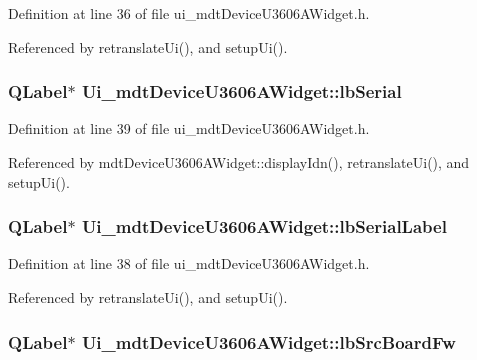 Definition at line 36 of file ui\-\_\-mdt\-Device\-U3606\-A\-Widget.\-h.



Referenced by retranslate\-Ui(), and setup\-Ui().

\hypertarget{class_ui__mdt_device_u3606_a_widget_a268a390c071e035acaa2f1b4d211bc31}{
\subsubsection[{lb\-Serial}]{\setlength{\rightskip}{0pt plus 5cm}Q\-Label$\ast$ Ui\-\_\-mdt\-Device\-U3606\-A\-Widget\-::lb\-Serial}}\label{class_ui__mdt_device_u3606_a_widget_a268a390c071e035acaa2f1b4d211bc31}


Definition at line 39 of file ui\-\_\-mdt\-Device\-U3606\-A\-Widget.\-h.



Referenced by mdt\-Device\-U3606\-A\-Widget\-::display\-Idn(), retranslate\-Ui(), and setup\-Ui().

\hypertarget{class_ui__mdt_device_u3606_a_widget_abdff7cf61e6f613b24d1799522c0e357}{
\subsubsection[{lb\-Serial\-Label}]{\setlength{\rightskip}{0pt plus 5cm}Q\-Label$\ast$ Ui\-\_\-mdt\-Device\-U3606\-A\-Widget\-::lb\-Serial\-Label}}\label{class_ui__mdt_device_u3606_a_widget_abdff7cf61e6f613b24d1799522c0e357}


Definition at line 38 of file ui\-\_\-mdt\-Device\-U3606\-A\-Widget.\-h.



Referenced by retranslate\-Ui(), and setup\-Ui().

\hypertarget{class_ui__mdt_device_u3606_a_widget_a7e48af183581a6be283f8fef932e8ec0}{
\subsubsection[{lb\-Src\-Board\-Fw}]{\setlength{\rightskip}{0pt plus 5cm}Q\-Label$\ast$ Ui\-\_\-mdt\-Device\-U3606\-A\-Widget\-::lb\-Src\-Board\-Fw}}\label{class_ui__mdt_device_u3606_a_widget_a7e48af183581a6be283f8fef932e8ec0}


